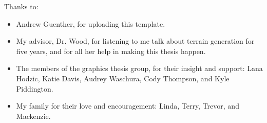 \noindent
Thanks to:
\begin{itemize}
	\item Andrew Guenther, for uploading this template.
	\item My advisor, Dr. Wood, for listening to me talk about terrain generation for five years, and for all her help in making this thesis happen.
	\item The members of the graphics thesis group, for their insight and support: Lana Hodzic, Katie Davis, Audrey Waschura, Cody Thompson, and Kyle Piddington.
	\item My family for their love and encouragement: Linda, Terry, Trevor, and Mackenzie.
\end{itemize}
